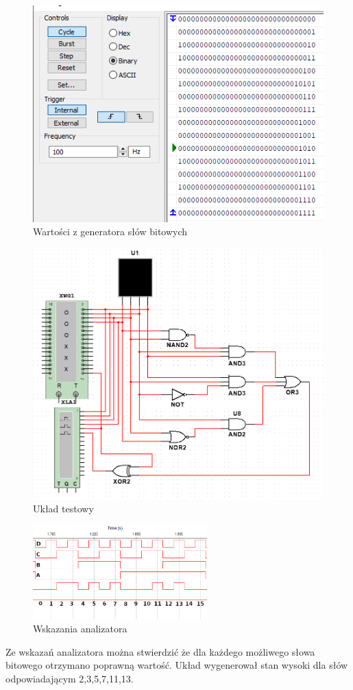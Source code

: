 \documentclass[12pt,a4paper,openright]{mwrep}
\begin{document}
\begin{figure}[H]
    \centering
    \includegraphics[width=1\textwidth]{images/1b_word_generator.PNG}
    \caption{Wartości z generatora słów bitowych}
    \label{rys:1b_test_circuit}
\end{figure}
\begin{figure}[H]
    \centering
    \includegraphics[width=1\textwidth]{images/1b_schema_2.PNG}
    \caption{Układ testowy}
    \label{rys:1b_test_circuit}
\end{figure}
\begin{figure}[H]
    \centering
    \includegraphics[width=0.6\textwidth]{images/1b_result.PNG}
    \caption{Wskazania analizatora}
    \label{rys:1b_test_results}
\end{figure}
Ze wskazań analizatora można stwierdzić że dla każdego możliwego słowa bitowego otrzymano poprawną wartość.
Układ wygenerował stan wysoki dla słów odpowiadającym 2,3,5,7,11,13.
\end{document}
